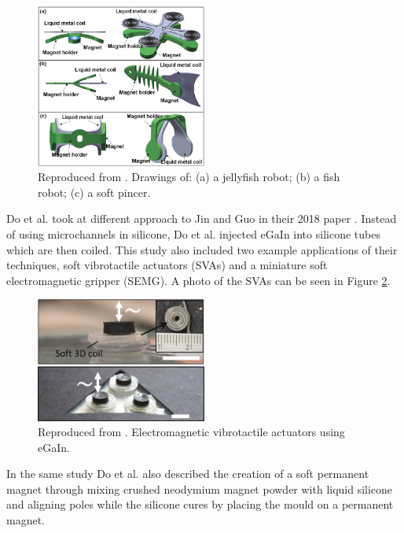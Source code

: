 \documentclass[a4paper,12pt]{article}
\begin{document}
\begin{figure}[h!]
    \centering
    \includegraphics[width=0.5\textwidth]{guoetal.png}
    \caption{Reproduced from \cite{guoLiquidMetalSpiral2018}. Drawings of: (a) a jellyfish robot; (b) a fish robot; (c) a soft pincer.}
    \label{fg:guoetal}
\end{figure}

Do et al. took at different approach to Jin and Guo in their 2018 paper \cite{doMiniatureSoftElectromagnetic2018}. Instead of using microchannels in silicone, Do et al. injected eGaIn into silicone tubes which are then coiled. This study also included two example applications of their techniques, soft vibrotactile actuators (SVAs) and a miniature soft electromagnetic gripper (SEMG). A photo of the SVAs can be seen in Figure \ref{fg:guoetal}.

\begin{figure}[h!]
    \centering
    \includegraphics[width=0.5\textwidth]{doetal.png}
    \caption{Reproduced from \cite{doMiniatureSoftElectromagnetic2018}. Electromagnetic vibrotactile actuators using eGaIn.}
    \label{fg:guoetal}
\end{figure}

In the same study Do et al. also described the creation of a soft permanent magnet through mixing crushed neodymium magnet powder with liquid silicone and aligning poles while the silicone cures by placing the mould on a permanent magnet.
\end{document}
